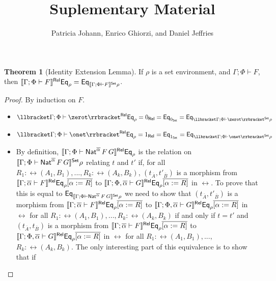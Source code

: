 \documentclass[acmsmall,review,anonymous]{acmart}
\title[Suplementary Material]{Suplementary Material} %
\author{Patricia Johann, Enrico Ghiorzi, and Daniel Jeffries}
\affiliation{
  \institution{Appalachian State University}            %
}
\theoremstyle{definition}
\newtheorem*{nono-theorem}{Theorem}
\newcommand{\set}{\mathsf{Set}}
\begin{document}
\maketitle

\begin{nono-theorem}[Identity Extension Lemma]\label{thm:iel}
If $\rho$ is a set environment, and $\Gamma; \Phi \vdash F$, then
$\relsem{\Gamma; \Phi \vdash F} \Eq_\rho = \Eq_{\setsem{\Gamma; \Phi
    \vdash F}\rho}$.
\end{nono-theorem}
\begin{proof}
By induction on $F$.
\begin{itemize}
\item $\relsem{\Gamma; \Phi \vdash \zerot} \Eq_{\rho} = 0_\rel =
  \Eq_{0_\set} = \Eq_{\setsem{\Gamma; \Phi \vdash \zerot}\rho}$
\item $\relsem{\Gamma; \Phi \vdash \onet} \Eq_{\rho} = 1_\rel =
  \Eq_{1_\set} = \Eq_{\setsem{\Gamma; \Phi \vdash \onet}\rho}$
\item By definition, $\llbracket{\Gamma; \Phi \vdash
  \mathsf{Nat}^{\overline\alpha} \,F\,G}\rrbracket^{\mathsf{Rel}} \mathsf{Eq}_{\rho}$ is the relation on
  $\setsem{\Gamma; \Phi \vdash \Nat^{\overline\alpha} \,F\,G}
  \rho$ relating $t$ and $t'$ if, for all ${R_1 :
    \rel(A_1,B_1)},...,{R_k : \rel(A_k,B_k)}$, $(t_{\overline{A}},
  t'_{\overline{B}})$ is a morphism from $\llbracket{\Gamma;
    \overline\alpha \vdash F}\rrbracket^{\mathsf{Rel}} \mathsf{Eq}_{\rho}\overline{[\alpha := R]}$ to
  $\llbracket{\Gamma ; \Phi, \overline\alpha \vdash G}\rrbracket^{\mathsf{Rel}}
  \mathsf{Eq}_{\rho}\overline{[\alpha := R]}$ in $\rel$.  To prove that this
  is equal to $\Eq_{\setsem{\Gamma; \Phi \vdash
      \Nat^{\overline\alpha} \,F\,G} \rho}$ we need to show that
  $(t_{\overline{A}}, t'_{\overline{B}})$ is a morphism from
  $\llbracket{\Gamma; \overline\alpha \vdash F}\rrbracket^{\mathsf{Rel}}
  \mathsf{Eq}_{\rho}\overline{[\alpha := R]}$ to $\llbracket{\Gamma ;
  \Phi, \overline\alpha \vdash G}\rrbracket^{\mathsf{Rel}} \mathsf{Eq}_{\rho}\overline{[\alpha := R]}$ in
  $\rel$ for all ${R_1 : \rel(A_1,B_1)},...,{R_k : \rel(A_k,B_k)}$ if
  and only if $t = t'$ and $(t_{\overline{A}}, t_{\overline{B}})$ is a
  morphism from $\llbracket{\Gamma; \overline\alpha \vdash F}\rrbracket^{\mathsf{Rel}}
  \mathsf{Eq}_{\rho}\overline{[\alpha := R]}$ to $\llbracket{\Gamma ; \Phi, \overline
    \alpha \vdash G}\rrbracket^{\mathsf{Rel}} \mathsf{Eq}_{\rho}\overline{[\alpha := R]}$ in $\rel$ for
  all ${R_1 : \rel(A_1,B_1)}, ...,$ ${R_k : \rel(A_k,B_k)}$. The only
  interesting part of this equivalence is to show that if

\end{itemize}
\end{proof}
\end{document}
